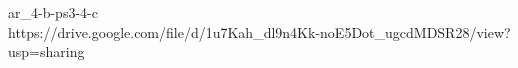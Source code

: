 ar_4-b-ps3-4-c\\
https://drive.google.com/file/d/1u7Kah_dl9n4Kk-noE5Dot_ugcdMDSR28/view?usp=sharing\\

